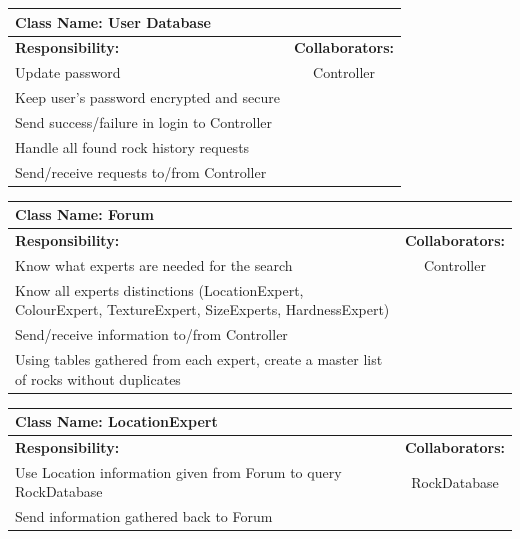 \documentclass[titlepage]{article}
\begin{document}
\begin{table}[!htb]
	\centering
	\begin{tabular}{| p{8cm} | c |} \hline 
		\multicolumn{2}{|l|}{\textbf{Class Name: User Database}} \\ \hline
		\textbf{Responsibility:} & \textbf{Collaborators:} \\ \hline
		Update password & Controller\\ \hline
		Keep user's password encrypted and secure & \\ \hline
		Send success/failure in login to Controller & \\ \hline	
		Handle all found rock history requests & \\ \hline
		Send/receive requests to/from Controller & \\ \hline
	\end{tabular}
\end{table}
\pagebreak

\begin{table}[!htb]
	\centering
	\begin{tabular}{| p{8cm} | c |} \hline 
		\multicolumn{2}{|l|}{\textbf{Class Name: Forum}} \\ \hline
		\textbf{Responsibility:} & \textbf{Collaborators:} \\ \hline
		Know what experts are needed for the search & Controller\\ \hline
		Know all experts distinctions (LocationExpert, ColourExpert, TextureExpert, SizeExperts, HardnessExpert) & \\ \hline
		Send/receive information to/from Controller & \\ \hline
		Using tables gathered from each expert, create a master list of rocks without duplicates & \\ \hline
	\end{tabular}
\end{table}

\begin{table}[!ht]
	\centering
	\begin{tabular}{| p{8cm} | c |} \hline
		\multicolumn{2}{|l|}{\textbf{Class Name: LocationExpert}} \\ \hline
		\textbf{Responsibility:} & \textbf{Collaborators:} \\ \hline
		Use Location information given from Forum to query RockDatabase & RockDatabase\\ \hline
		Send information gathered back to Forum & \\ \hline
	\end{tabular}
\end{table}
\end{document}
